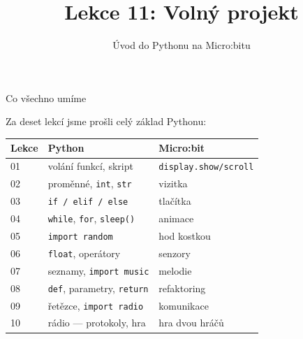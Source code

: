 

\title{Lekce 11: Volný projekt}
\subtitle{Úvod do Pythonu na Micro:bitu}
\date{}



\begin{frame}
  \titlepage
\end{frame}

\begin{frame}{Co všechno umíme}

  Za deset lekcí jsme prošli celý základ Pythonu:

  \bigskip
  \begin{center}
  \begin{tabular}{lll}
    \toprule
    \textbf{Lekce} & \textbf{Python} & \textbf{Micro:bit} \\
    \midrule
    01 & volání funkcí, skript  & \texttt{display.show/scroll} \\
    02 & proměnné, \texttt{int}, \texttt{str} & vizitka \\
    03 & \texttt{if / elif / else} & tlačítka \\
    04 & \texttt{while}, \texttt{for}, \texttt{sleep()} & animace \\
    05 & \texttt{import random} & hod kostkou \\
    06 & \texttt{float}, operátory & senzory \\
    07 & seznamy, \texttt{import music} & melodie \\
    08 & \texttt{def}, parametry, \texttt{return} & refaktoring \\
    09 & řetězce, \texttt{import radio} & komunikace \\
    10 & rádio — protokoly, hra & hra dvou hráčů \\
    \bottomrule
  \end{tabular}
  \end{center}
\end{frame}

